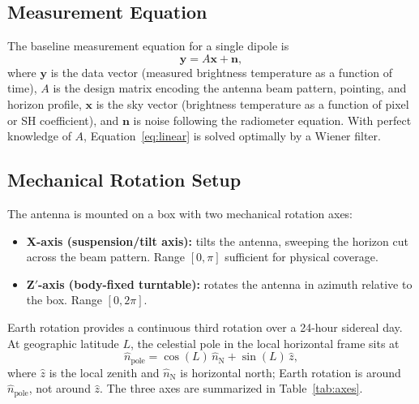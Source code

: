 \documentclass{aastex631}
\theoremstyle{plain}
\theoremstyle{remark}
\begin{document}
\subsection{Measurement Equation}

The baseline measurement equation for a single dipole is
\begin{equation} \label{eq:linear}
  \mathbf{y} = A\mathbf{x} + \mathbf{n},
\end{equation}
where $\mathbf{y}$ is the data vector (measured brightness temperature
as a function of time), $A$ is the design matrix encoding the antenna
beam pattern, pointing, and horizon profile, $\mathbf{x}$ is the sky
vector (brightness temperature as a function of pixel or SH
coefficient), and $\mathbf{n}$ is noise following the radiometer
equation.
With perfect knowledge of $A$, Equation~\ref{eq:linear} is solved
optimally by a Wiener filter.

\subsection{Mechanical Rotation Setup}

The antenna is mounted on a box with two mechanical rotation axes:
\begin{itemize}
  \item \textbf{X-axis (suspension/tilt axis):} tilts the antenna,
    sweeping the horizon cut across the beam pattern.
    Range $[0, \pi]$ sufficient for physical coverage.
  \item \textbf{Z$'$-axis (body-fixed turntable):} rotates the antenna
    in azimuth relative to the box. Range $[0, 2\pi]$.
\end{itemize}
Earth rotation provides a continuous third rotation over a 24-hour
sidereal day.
At geographic latitude $L$, the celestial pole in the local horizontal
frame sits at
\begin{equation}
  \hat{n}_\mathrm{pole} = \cos(L)\,\hat{n}_\mathrm{N} + \sin(L)\,\hat{z},
\end{equation}
where $\hat{z}$ is the local zenith and $\hat{n}_\mathrm{N}$ is
horizontal north; Earth rotation is around $\hat{n}_\mathrm{pole}$,
not around $\hat{z}$.
The three axes are summarized in Table~\ref{tab:axes}.
\end{document}
